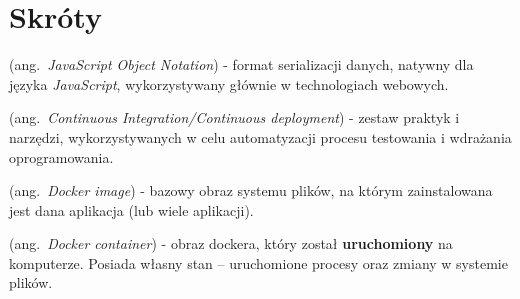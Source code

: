 \chapter*{Skróty}\mbox{}
\label{sec:skroty}
\noindent
\begin{description}[labelwidth=*]
  \item [JSON] (ang.\ \emph{JavaScript Object Notation}) %
      - format serializacji danych, natywny dla języka \mbox{\textit{JavaScript}},
      wykorzystywany głównie w technologiach webowych.
  \item [CI/CD] (ang.\ \emph{Continuous Integration/Continuous deployment})
      - zestaw praktyk i narzędzi, wykorzystywanych w celu automatyzacji procesu
      testowania i wdrażania oprogramowania.
  \item [Obraz dockera] (ang.\ \emph{Docker image}) - bazowy obraz systemu plików,
        na którym zainstalowana jest dana aplikacja (lub wiele aplikacji).
  \item [Kontener dockera] (ang.\ \emph{Docker container}) - obraz dockera,
        który został \textbf{uruchomiony} na komputerze. Posiada własny stan -- 
        uruchomione procesy oraz zmiany w systemie \mbox{plików}.
\end{description}
